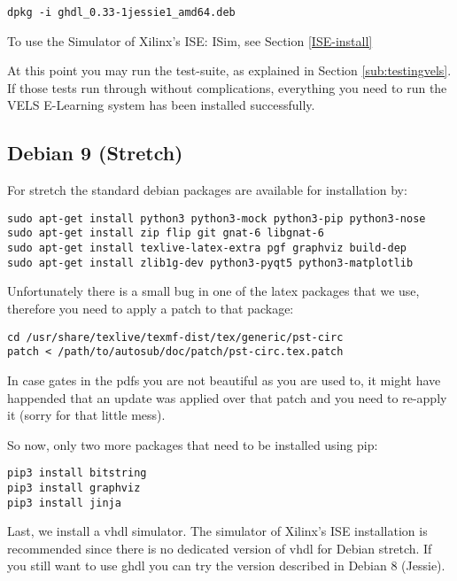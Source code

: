 \begin{verbatim}
dpkg -i ghdl_0.33-1jessie1_amd64.deb
\end{verbatim}

To use the Simulator of Xilinx's ISE: ISim, see Section \ref{ISE-install}

At this point you may run the test-suite, as explained in Section \ref{sub:testingvels}.
If those tests run through without complications, everything you need to run the VELS
E-Learning system has been installed successfully.

\subsection{Debian 9 (Stretch)}

For stretch the standard debian packages are available for installation by:

\begin{verbatim}
sudo apt-get install python3 python3-mock python3-pip python3-nose
sudo apt-get install zip flip git gnat-6 libgnat-6
sudo apt-get install texlive-latex-extra pgf graphviz build-dep
sudo apt-get install zlib1g-dev python3-pyqt5 python3-matplotlib 
\end{verbatim}

Unfortunately there is a small bug in one of the latex packages that we use,
therefore you need to apply a patch to that package:

\begin{verbatim}
cd /usr/share/texlive/texmf-dist/tex/generic/pst-circ
patch < /path/to/autosub/doc/patch/pst-circ.tex.patch
\end{verbatim}

In case gates in the pdfs you are not beautiful as you are used to, it might have
happended that an update was applied over that patch and you need to re-apply it (sorry for that little mess).

So now, only two more packages that need to be installed using pip:

\begin{verbatim}
pip3 install bitstring
pip3 install graphviz
pip3 install jinja
\end{verbatim}

Last, we install a vhdl simulator. The simulator of Xilinx's ISE installation is recommended since there is no dedicated
version of vhdl for Debian stretch. 
If you still want to use ghdl you can try the version described in Debian 8 (Jessie).

